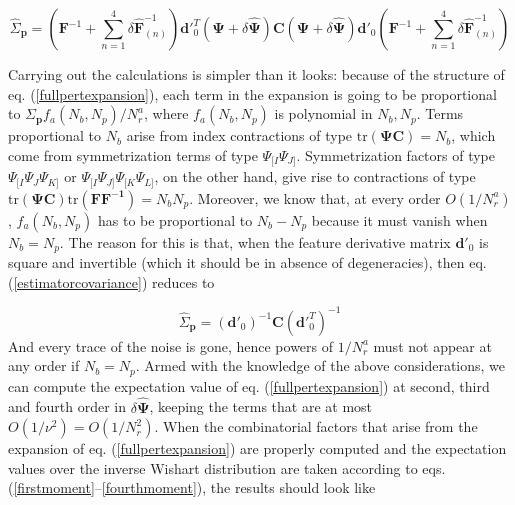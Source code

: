 \documentclass[reprint,aps,prd,superscriptaddress,showkeys,showpacs]{revtex4-1}
\newcommand{\bb}[1]{\mathbf{#1}}
\newcommand{\bbh}[1]{\mathbf{\hat{#1}}}
\newcommand{\h}[1]{\hat{#1}}
\begin{document}
\begin{widetext}
\begin{equation}
\label{fullpertexpansion}
\h{\Sigma}_\bb{p} = \left(\bb{F}^{-1}+\sum_{n=1}^4\delta\bbh{F}^{-1}_{(n)}\right)\bb{d}'^T_0(\bb{\Psi}+\delta\bbh{\Psi})\bb{C}(\bb{\Psi}+\delta\bbh{\Psi})\bb{d}'_0\left(\bb{F}^{-1}+\sum_{n=1}^4\delta\bbh{F}^{-1}_{(n)}\right)
\end{equation}
\end{widetext}
%
Carrying out the calculations is simpler than it looks: because of the structure of eq. (\ref{fullpertexpansion}), each term in the expansion is going to be proportional to $\Sigma_\bb{p}f_a(N_b,N_p)/N_r^a$, where $f_a(N_b,N_p)$ is polynomial in $N_b,N_p$. Terms proportional to $N_b$ arise from index contractions of type $\mathrm{tr}(\bb{\Psi C})=N_b$, which come from symmetrization terms of type $\Psi_{[I}\Psi_{J]}$. Symmetrization factors of type $\Psi_{[I}\Psi_J\Psi_{K]}$ or $\Psi_{[I}\Psi_{J]}\Psi_{[K}\Psi_{L]}$, on the other hand, give rise to contractions of type $\mathrm{tr}(\bb{\Psi C})\mathrm{tr}(\bb{\bb{F}\bb{F}^{-1}})=N_bN_p$. Moreover, we know that, at every order $O(1/N_r^a)$, $f_a(N_b,N_p)$ has to be proportional to $N_b-N_p$ because it must vanish when $N_b=N_p$. The reason for this is that, when the feature derivative matrix $\bb{d}'_0$ is square and invertible (which it should be in absence of degeneracies), then eq. (\ref{estimatorcovariance}) reduces to 

\begin{equation}
\h{\Sigma}_\bb{p} = (\bb{d}'_0)^{-1}\bb{C}(\bb{d}'^T_0)^{-1}
\end{equation} 
%
And every trace of the noise is gone, hence powers of $1/N_r^a$ must not appear at any order if $N_b=N_p$. Armed with the knowledge of the above considerations, we can compute the expectation value of eq. (\ref{fullpertexpansion}) at second, third and fourth order in $\delta\bbh{\Psi}$, keeping the terms that are at most $O(1/\nu^2)=O(1/N_r^2)$. When the combinatorial factors that arise from the expansion of eq. (\ref{fullpertexpansion}) are properly computed and the expectation values over the inverse Wishart distribution are taken according to eqs. (\ref{firstmoment}--\ref{fourthmoment}), the results should look like
\end{document}

